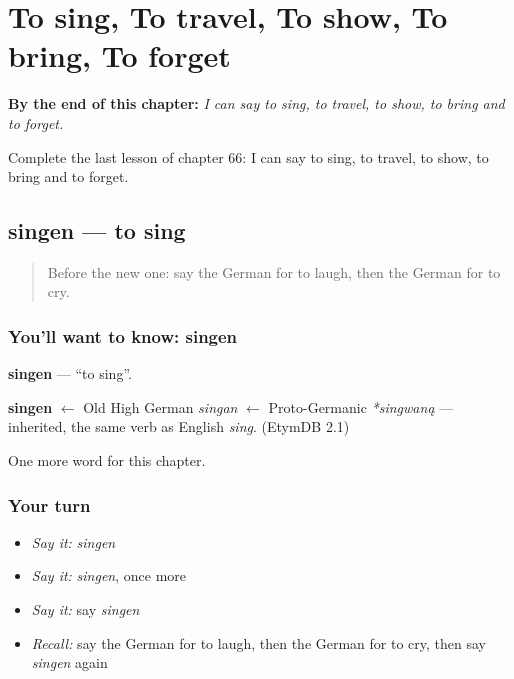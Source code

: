 
\chapter{To sing, To travel, To show, To bring, To forget}
\label{ch:ge-to-sing-to-travel-to-show-to-bring-to-forget}

\begin{chapteropening}
\textbf{By the end of this chapter:} \emph{I can say to sing, to travel, to show, to bring and to forget.}

Complete the last lesson of chapter 66: I can say to sing, to travel, to show, to bring and to forget.
\end{chapteropening}

\section[singen]{singen — to sing}

\label{lesson:GE-C66-singen}



\begin{quote}
Before the new one: say the German for to laugh, then the German for to cry.
\end{quote}

\subsection*{You'll want to know: singen}
\textbf{singen} — \textquotedblleft{}to sing\textquotedblright{}.

\begin{cousinweb}
\textbf{singen} $\leftarrow$ Old High German \emph{singan} $\leftarrow$ Proto-Germanic \emph{*singwaną} — inherited, the same verb as English \emph{sing}. (EtymDB 2.1)
\end{cousinweb}

\begin{grammarlens}[title={What you've built}]
One more word for this chapter.
\end{grammarlens}

\subsection*{Your turn}
\begin{itemize}
\raggedright
  \item \emph{Say it:} \emph{singen}
  \item \emph{Say it:} \emph{singen}, once more
  \item \emph{Say it:} say \emph{singen}
  \item \emph{Recall:} say the German for to laugh, then the German for to cry, then say \emph{singen} again
\end{itemize}

